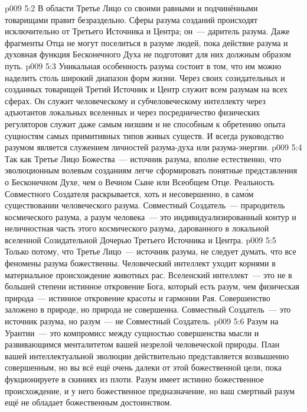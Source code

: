\vs p009 5:2 В области  Третье Лицо со своими равными и подчинёнными товарищами правит безраздельно. Сферы разума созданий происходят исключительно от Третьего Источника и Центра; он~--- даритель разума. Даже фрагменты Отца не могут поселиться в разуме людей, пока действие разума и духовная функция Бесконечного Духа не подготовят для них должным образом путь.
\vs p009 5:3 Уникальная особенность разума состоит в том, что им можно наделить столь широкий диапазон форм жизни. Через своих созидательных и созданных товарищей Третий Источник и Центр служит всем разумам на всех сферах. Он служит человеческому и субчеловеческому интеллекту через адъютантов локальных вселенных и через посредничество физических регуляторов служит даже самым низшим и не способным к обретению опыта сущностям самых примитивных типов живых существ. И всегда руководство разумом является служением личностей разума\hyp{}духа или разума\hyp{}энергии.
\vs p009 5:4 \pc Так как Третье Лицо Божества~--- источник разума, вполне естественно, что эволюционным волевым созданиям легче сформировать понятные представления о Бесконечном Духе, чем о Вечном Сыне или Всеобщем Отце. Реальность Совместного Создателя раскрывается, хоть и несовершенно, в сам\'ом существовании человеческого разума. Совместный Создатель~--- прародитель космического разума, а разум человека~--- это индивидуализированный контур и неличностная часть этого космического разума, дарованного в локальной вселенной Созидательной Дочерью Третьего Источника и Центра.
\vs p009 5:5 \pc Только потому, что Третье Лицо~--- источник разума, не следует думать, что все феномены разума божественны. Человеческий интеллект уходит корнями в материальное происхождение животных рас. Вселенский интеллект~--- это не в большей степени истинное откровение Бога, который есть разум, чем физическая природа~--- истинное откровение красоты и гармонии Рая. Совершенство заложено в природе, но природа не совершенна. Совместный Создатель~--- это источник разума, но разум~--- не Совместный Создатель.
\vs p009 5:6 Разум на Урантии~--- это компромисс между сущностью совершенства мысли и развивающимся менталитетом вашей незрелой человеческой природы. План вашей интеллектуальной эволюции действительно представляется возвышенно совершенным, но вы всё ещё очень далеки от этой божественной цели, пока фукционируете в скиниях из плоти. Разум имеет истинно божественное происхождение, и у него божественное предназначение, но ваш смертный разум ещё не обладает божественным достоинством.
